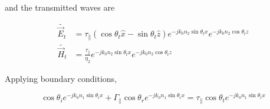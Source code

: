 \documentclass[12pt]{article}
\begin{document}
and the transmitted waves are

\begin{align*}
    \tilde{\vec E_t} &= \tau_\parallel(\cos\theta_t\hat x - \sin\theta_t\hat z)e^{-jk_0n_2\sin\theta_tx}e^{-jk_0n_2\cos\theta_tz} \\
    \tilde{\vec H_t} &= \frac{\tau_\parallel}{\eta_2} e^{-jk_0n_2\sin\theta_tx}e^{-jk_0n_2\cos\theta_tz}
\end{align*}

Applying boundary conditions,

$$\cos\theta_ie^{-jk_0n_1\sin\theta_ix} + \Gamma_\parallel\cos\theta_re^{-jk_0n_1\sin\theta_ix} = \tau_\parallel\cos\theta_te^{-jk_0n_1\sin\theta_ix}$$
\end{document}
